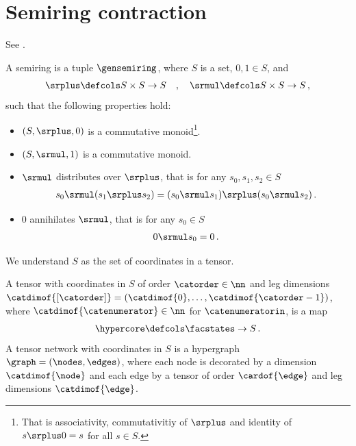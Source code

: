 \section{Semiring contraction}


See \cite{liu_computing_2023,liu_tropical_2021}.


\begin{definition}
    A semiring is a tuple $\gensemiring$, where $S$ is a set, $0,1\in S$, and
    \begin{align*}
        \srplus \defcols S \times S \rightarrow S \quad, \quad \srmul \defcols S \times S \rightarrow S \, ,
    \end{align*}
    such that the following properties hold:
    \begin{itemize}
        \item[(i)] $(S,\srplus,0)$ is a commutative monoid\footnote{That is associativity, commutativitiy of $\srplus$ and identity of $s\srplus 0=s$ for all $s\in S$.}.
        \item[(ii)] $(S,\srmul,1)$ is a commutative monoid.
        \item[(iii)] $\srmul$ distributes over $\srplus$, that is for any $s_0,s_1,s_2\in S$
        \begin{align*}
            s_0 \srmul (s_1 \srplus s_2)
            = (s_0 \srmul s_1) \srplus (s_0 \srmul s_2) \, .
        \end{align*}
        \item[(iv)] $0$ annihilates $\srmul$, that is for any $s_0\in S$
        \begin{align*}
            0 \srmul s_0 = 0 \, .
        \end{align*}
    \end{itemize}
\end{definition}

We understand $S$ as the set of coordinates in a tensor.

\begin{definition}
    A tensor with coordinates in $S$ of order $\catorder\in\nn$ and leg dimensions $\catdimof{[\catorder]}=(\catdimof{0},\ldots,\catdimof{\catorder-1})$, where $\catdimof{\catenumerator}\in\nn$ for $\catenumeratorin$, is a map
    \begin{align*}
        \hypercore \defcols \facstates \rightarrow S \, .
    \end{align*}
    A tensor network with coordinates in $S$ is a hypergraph $\graph=(\nodes,\edges)$, where each node is decorated by a dimension $\catdimof{\node}$ and each edge by a tensor of order $\cardof{\edge}$ and leg dimensions $\catdimof{\edge}$.
\end{definition}


